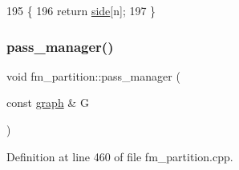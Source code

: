 \begin{DoxyCode}
195 \{
196     \textcolor{keywordflow}{return} \mbox{\hyperlink{classfm__partition_af83309e781e9658fc0ff923ced087bfc}{side}}[n];
197 \}
\end{DoxyCode}
\mbox{\label{classfm__partition_aec7b2a315bc003fbd98debd5cd879f99}} 
\subsubsection{\texorpdfstring{pass\+\_\+manager()}{pass\_manager()}}
{\footnotesize\ttfamily void fm\+\_\+partition\+::pass\+\_\+manager (\begin{DoxyParamCaption}\item[{const \mbox{\hyperlink{classgraph}{graph}} \&}]{G }\end{DoxyParamCaption})\hspace{0.3cm}{\ttfamily [protected]}}



Definition at line 460 of file fm\+\_\+partition.\+cpp.


